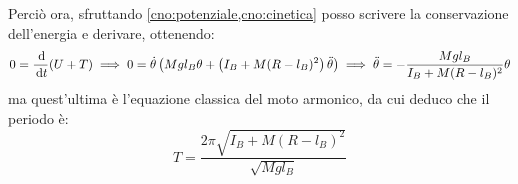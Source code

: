 \documentclass[../main.tex]{subfiles}
\begin{document}
\begin{itemize}
	Perciò ora, sfruttando \cref{cno:potenziale,cno:cinetica} posso scrivere la conservazione dell'energia e derivare, ottenendo:
	\begin{equation*}
		0=\frac{\,\mathrm{d}}{\,\mathrm{d} t}(U+T) \implies
		0=\dot\theta\left(Mgl_B\theta+\left(I_B+M(R-l_B)^2\right)\ddot\theta\right)\implies
		\ddot\theta=-\frac{Mgl_B}{I_B+M(R-l_B)^2}\theta
	\end{equation*}
	ma quest'ultima è l'equazione classica del moto armonico, da cui deduco che il periodo è:
	\begin{equation*}
		T=\frac{2\pi\sqrt{I_B+M(R-l_B)^2}}{\sqrt{Mgl_B}}
	\end{equation*}

\end{itemize}
\end{document}
